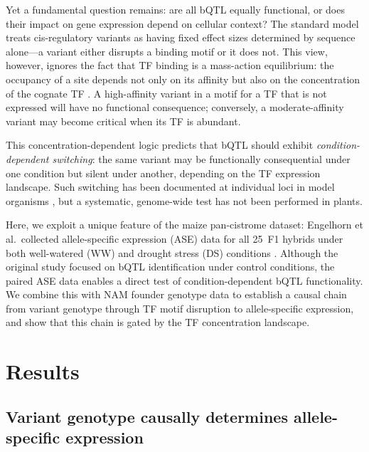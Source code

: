 \documentclass[10pt,letterpaper]{article}
\begin{document}
Yet a fundamental question remains: are all bQTL equally functional, or does
their impact on gene expression depend on cellular context? The standard model
treats cis-regulatory variants as having fixed effect sizes determined by
sequence alone---a variant either disrupts a binding motif or it does not. This
view, however, ignores the fact that TF binding is a mass-action equilibrium:
the occupancy of a site depends not only on its affinity but also on the
concentration of the cognate TF \cite{segal2008,levo2012}. A high-affinity
variant in a motif for a TF that is not expressed will have no functional
consequence; conversely, a moderate-affinity variant may become critical when
its TF is abundant.

This concentration-dependent logic predicts that bQTL should exhibit
\emph{condition-dependent switching}: the same variant may be functionally
consequential under one condition but silent under another, depending on the
TF expression landscape. Such switching has been documented at individual loci
in model organisms \cite{kumasaka2016,ban2015,moyerbrailean2016}, but a
systematic, genome-wide test has not been performed in plants.

Here, we exploit a unique feature of the maize pan-cistrome dataset: Engelhorn
et al.\ collected allele-specific expression (ASE) data for all 25~F1 hybrids
under both well-watered (WW) and drought stress (DS) conditions
\cite{engelhorn2025}. Although the original study focused on bQTL
identification under control conditions, the paired ASE data enables a direct
test of condition-dependent bQTL functionality. We combine this with NAM
founder genotype data \cite{grzybowski2023} to establish a causal chain from
variant genotype through TF motif disruption to allele-specific expression,
and show that this chain is gated by the TF concentration landscape.


\section*{Results}

\subsection*{Variant genotype causally determines allele-specific expression}
\end{document}
